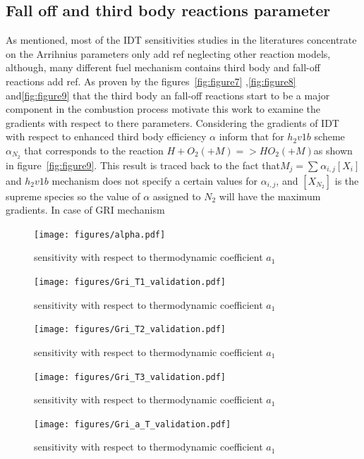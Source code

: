 \documentclass[preprint,review,12pt]{elsarticle}
\begin{document}
\subsection{Fall off and third body reactions parameter}
As mentioned, most of the IDT sensitivities studies in the literatures concentrate on the Arrihnius parameters only{\color{red} add ref} neglecting other reaction models, although, many different fuel mechanism contains third body and fall-off reactions{\color{red} add ref}.  As proven by the figures~\ref{fig:figure7} ,\ref{fig:figure8} and\ref{fig:figure9} that the third body an fall-off reactions start to be a major component in the combustion process motivate this work to examine the gradients with respect to there parameters. 
 Considering the gradients of IDT with respect to enhanced third body efficiency $\alpha$ inform that for $h_2v1b$ scheme $\alpha_{N_2}$ that corresponds to the reaction $H+O_2 (+M)=> HO_2(+M)$as shown in figure~\ref{fig:figure9}. This result is traced back to the fact that$M_j=\sum_{}^{}\alpha_{i,j} [X_i]$  and $h_2v1b$ mechanism does not specify a certain values for $\alpha_{i,j}$, and $[X_{N_2}]$ is the supreme species so the value of $\alpha$ assigned to $N_2$ will have the maximum gradients.
 In case of GRI mechanism 
\begin{figure}
\centering
 {\texttt{[image: figures/alpha.pdf]}}
\caption{sensitivity with respect to thermodynamic coefficient $a_1$}
    \label{fig:figure10}
\end{figure}
\begin{figure}
\centering
 {\texttt{[image: figures/Gri\_T1\_validation.pdf]}}
\caption{sensitivity with respect to thermodynamic coefficient $a_1$}
    \label{fig:figure11}
\end{figure}
\begin{figure}
\centering
 {\texttt{[image: figures/Gri\_T2\_validation.pdf]}}
\caption{sensitivity with respect to thermodynamic coefficient $a_1$}
    \label{fig:figure12}
\end{figure}
\begin{figure}
\centering
 {\texttt{[image: figures/Gri\_T3\_validation.pdf]}}
\caption{sensitivity with respect to thermodynamic coefficient $a_1$}
    \label{fig:figure13}
\end{figure}
\begin{figure}
\centering
 {\texttt{[image: figures/Gri\_a\_T\_validation.pdf]}}
\caption{sensitivity with respect to thermodynamic coefficient $a_1$}
    \label{fig:figure14}
\end{figure}
\end{document}
